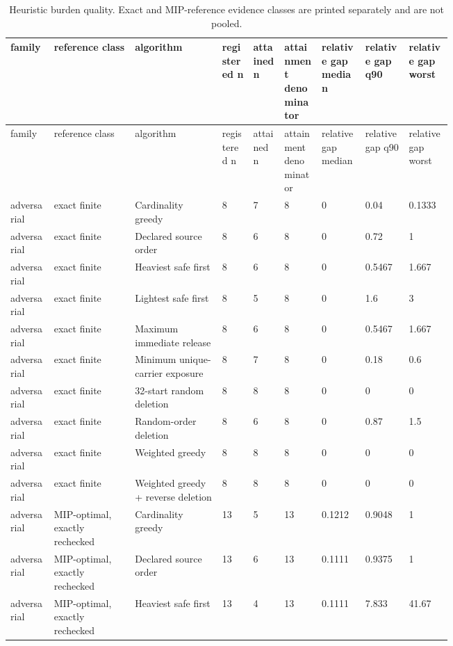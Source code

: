 {\footnotesize
\begin{longtable}{p{0.075\linewidth}p{0.13\linewidth}p{0.14\linewidth}p{0.055\linewidth}p{0.055\linewidth}p{0.065\linewidth}p{0.075\linewidth}p{0.075\linewidth}p{0.075\linewidth}}
\caption{Heuristic burden quality. Exact and MIP-reference evidence classes are printed separately and are not pooled.}\label{tab:aor-heuristic-quality}\\
\toprule
family & reference class & algorithm & registered n & attained n & attainment denominator & relative gap median & relative gap q90 & relative gap worst \\
\midrule
\endfirsthead
\toprule
family & reference class & algorithm & registered n & attained n & attainment denominator & relative gap median & relative gap q90 & relative gap worst \\
\midrule
\endhead
adversarial & exact finite & Cardinality greedy & 8 & 7 & 8 & 0 & 0.04 & 0.1333 \\
adversarial & exact finite & Declared source order & 8 & 6 & 8 & 0 & 0.72 & 1 \\
adversarial & exact finite & Heaviest safe first & 8 & 6 & 8 & 0 & 0.5467 & 1.667 \\
adversarial & exact finite & Lightest safe first & 8 & 5 & 8 & 0 & 1.6 & 3 \\
adversarial & exact finite & Maximum immediate release & 8 & 6 & 8 & 0 & 0.5467 & 1.667 \\
adversarial & exact finite & Minimum unique-carrier exposure & 8 & 7 & 8 & 0 & 0.18 & 0.6 \\
adversarial & exact finite & 32-start random deletion & 8 & 8 & 8 & 0 & 0 & 0 \\
adversarial & exact finite & Random-order deletion & 8 & 6 & 8 & 0 & 0.87 & 1.5 \\
adversarial & exact finite & Weighted greedy & 8 & 8 & 8 & 0 & 0 & 0 \\
adversarial & exact finite & Weighted greedy + reverse deletion & 8 & 8 & 8 & 0 & 0 & 0 \\
adversarial & MIP-optimal, exactly rechecked & Cardinality greedy & 13 & 5 & 13 & 0.1212 & 0.9048 & 1 \\
adversarial & MIP-optimal, exactly rechecked & Declared source order & 13 & 6 & 13 & 0.1111 & 0.9375 & 1 \\
adversarial & MIP-optimal, exactly rechecked & Heaviest safe first & 13 & 4 & 13 & 0.1111 & 7.833 & 41.67 \\

\end{longtable}}
